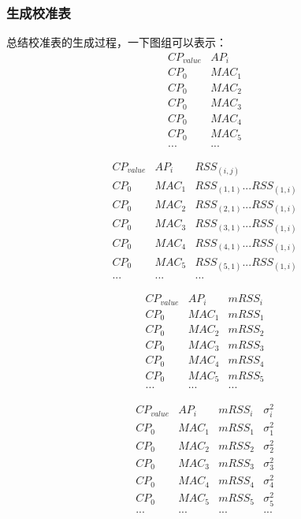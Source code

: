 \documentclass[UTF8, twocolumn ]{ctexart}
\begin{document}
\subsubsection{生成校准表}
总结校准表的生成过程，一下图组可以表示：
\begin{displaymath}
\begin{array}{c|c}
CP_{value} & AP_{i} \\ \hline
CP_{0} & MAC_{1} \\
CP_{0} & MAC_{2} \\
CP_{0} & MAC_{3} \\
CP_{0} & MAC_{4} \\
CP_{0} & MAC_{5} \\
... & ...
\end{array}
\end{displaymath}

\begin{displaymath}
\begin{array}{c|c|c}
CP_{value} & AP_{i} & RSS_{(i,j)} \\ \hline
CP_{0} & MAC_{1} & RSS_{(1,1)}...RSS_{(1,i)} \\
CP_{0} & MAC_{2} & RSS_{(2,1)}...RSS_{(1,i)} \\
CP_{0} & MAC_{3} & RSS_{(3,1)}...RSS_{(1,i)} \\
CP_{0} & MAC_{4} & RSS_{(4,1)}...RSS_{(1,i)} \\
CP_{0} & MAC_{5} & RSS_{(5,1)}...RSS_{(1,i)} \\
... & ... & ...
\end{array}
\end{displaymath}

\begin{displaymath}
\begin{array}{c|c|c}
CP_{value} & AP_{i} & mRSS_{i} \\ \hline
CP_{0} & MAC_{1} & mRSS_{1} \\
CP_{0} & MAC_{2} & mRSS_{2} \\
CP_{0} & MAC_{3} & mRSS_{3} \\
CP_{0} & MAC_{4} & mRSS_{4} \\
CP_{0} & MAC_{5} & mRSS_{5} \\
... & ... & ...
\end{array}
\end{displaymath}

\begin{displaymath}
\begin{array}{c|c|c|c}
CP_{value} & AP_{i} & mRSS_{i} & \sigma^{2}_{i} \\ \hline
CP_{0} & MAC_{1} & mRSS_{1} & \sigma^{2}_{1} \\
CP_{0} & MAC_{2} & mRSS_{2} & \sigma^{2}_{2} \\
CP_{0} & MAC_{3} & mRSS_{3} & \sigma^{2}_{3} \\
CP_{0} & MAC_{4} & mRSS_{4} & \sigma^{2}_{4} \\
CP_{0} & MAC_{5} & mRSS_{5} & \sigma^{2}_{5} \\
... & ... & ... & ...
\end{array}
\end{displaymath}
\end{document}
